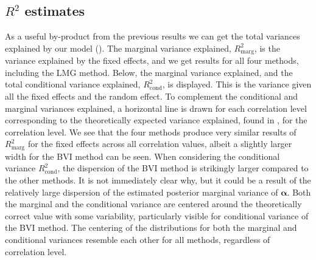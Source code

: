 \subsection{\texorpdfstring{$R^2$}{Lg} estimates}
\label{sec:R2} 
As a useful by-product from the previous results we can get the total variances explained by our model ().
The marginal variance explained, $R^2_{\text{marg}}$, is the variance explained by the fixed effects, and we get results for all four methods, including the LMG method.
Below, the marginal variance explained, and the total conditional variance explained, $R^2_{\text{cond}}$, is displayed. 
This is the variance given all the fixed effects and the random effect.
To complement the conditional and marginal variances explained, a horizontal line is drawn for each correlation level corresponding to the theoretically expected variance explained, found in , for the correlation level. 
\newline
\newline
We see that the four methods produce very similar results of $R^2_{\text{marg}}$ for the fixed effects across all correlation values, albeit a slightly larger width for the BVI method can be seen.
When considering the conditional variance $R^2_{\text{cond}}$, the dispersion of the BVI method is strikingly larger compared to the other methods. 
It is not immediately clear why, but it could be a result of the relatively large dispersion of the estimated posterior marginal variance of $\boldsymbol{\alpha}$.
Both the marginal and the conditional variance are centered around the theoretically correct value with some variability, particularly visible for conditional variance of the BVI method. 
The centering of the distributions for both the marginal and conditional variances resemble each other for all methods, regardless of correlation level.
